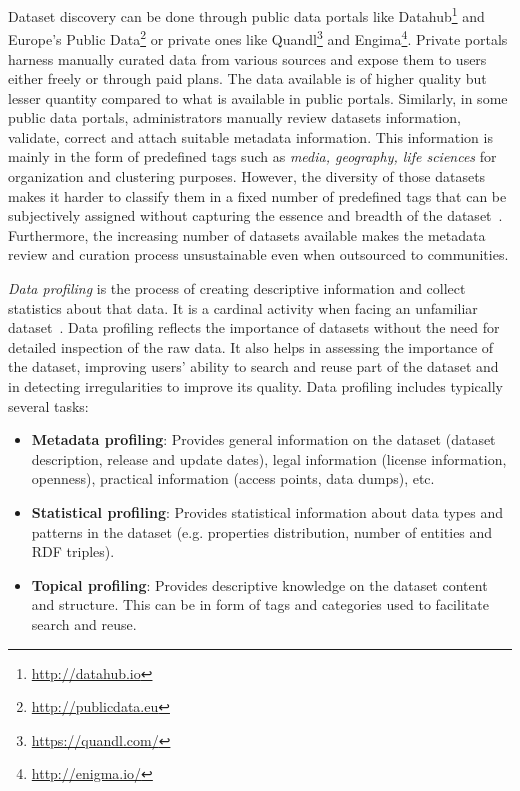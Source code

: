 \documentclass[runningheads,a4paper]{llncs}
\begin{document}
Dataset discovery can be done through public data portals like Datahub\footnote{\url{http://datahub.io}} and Europe's Public Data\footnote{\url{http://publicdata.eu}} or private ones like Quandl\footnote{\url{https://quandl.com/}} and Engima\footnote{\url{http://enigma.io/}}. Private portals harness manually curated data from various sources and expose them to users either freely or through paid plans. The data available is of higher quality but lesser quantity compared to what is available in public portals. Similarly, in some public data portals, administrators manually review datasets information, validate, correct and attach suitable metadata information. This information is mainly in the form of predefined tags such as \textit{media, geography, life sciences} for organization and clustering purposes. However, the diversity of those datasets makes it harder to classify them in a fixed number of predefined tags that can be subjectively assigned without capturing the essence and breadth of the dataset~\cite{6690016}. Furthermore, the increasing number of datasets available makes the metadata review and curation process unsustainable even when outsourced to communities.

\textit{Data profiling} is the process of creating descriptive information and collect statistics about that data. It is a cardinal activity when facing an unfamiliar dataset~\cite{semwebprofiling}. Data profiling reflects the importance of datasets without the need for detailed inspection of the raw data.  It also helps in assessing the importance of the dataset, improving users' ability to search and reuse part of the dataset and in detecting irregularities to improve its quality. Data profiling includes typically several tasks:
\begin{itemize}
  \item \textbf{Metadata profiling}: Provides general information on the dataset (dataset description, release and update dates), legal information (license information, openness), practical information (access points, data dumps), etc.
  \item \textbf{Statistical profiling}: Provides statistical information about data types and patterns in the dataset (e.g. properties distribution, number of entities and RDF triples).
  \item \textbf{Topical profiling}: Provides descriptive knowledge on the dataset content and structure. This can be in form of tags and categories used to facilitate search and reuse.
\end{itemize}
\end{document}
